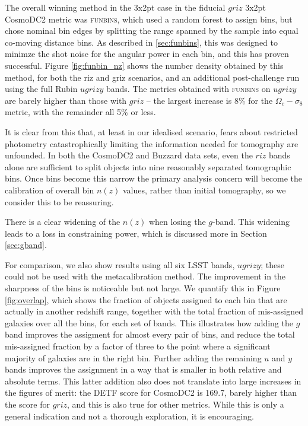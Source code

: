 \documentclass[twocolumn,twocolappendix]{aastex63}
\begin{document}
The overall winning method in the 3x2pt case in the fiducial $griz$ 3x2pt CosmoDC2 metric was \textsc{funbins},
which used a random forest to assign bins, but chose nominal bin edges by splitting the range spanned
by the sample into equal co-moving distance bins. As described in \autoref{sec:funbins},  this was designed
to minimze the shot noise for the angular power in each bin, and this has proven successful. 
Figure \ref{fig:funbin_nz} shows the number density obtained by this method, for both the riz and griz 
scenarios, and an additional post-challenge run using the full Rubin $ugrizy$ bands.  The metrics
obtained with \textsc{funbins} on $ugrizy$ are barely higher than those with $griz$ -- the largest
increase is 8\% for the $\Omega_c-\sigma_8$ metric, with the remainder all 5\% or less.

It is clear from this that, at least in our idealised scenario,  fears about restricted photometry 
catastrophically limiting
the information needed for tomography are unfounded.
In both the CosmoDC2 and Buzzard data sets,
even the $riz$ bands alone are sufficient to split objects into nine reasonably separated
tomographic bins.  Once bins become this narrow the primary analysis concern will become the calibration 
of overall bin $n(z)$ values, rather than initial tomography, so we consider this to be reassuring.

There is a clear widening of the $n(z)$ when losing the $g$-band.  This widening leads to a loss in 
constraining power, which is discussed more in Section \ref{sec:gband}.

For comparison, we also show results using all six LSST bands, $ugrizy$; these could not be used
with the metacalibration method. The improvement in the sharpness of the bins is noticeable but not large.
We quantify this in Figure \ref{fig:overlap}, which shows the fraction of objects assigned to each
bin that are actually in another redshift range, together with the total fraction of mis-assigned galaxies 
over all the bins, for each set of bands. This illustrates how adding the $g$ band improves the assigment
for almost every pair of bins, and reduce the total mis-assigned fraction by a factor of three to the 
point where a significant majority of galaxies are in the right bin.  Further adding the remaining $u$ and $y$
bands improves the assignment in a way that is smaller in both relative and absolute terms.
This latter addition also does not translate into large increases in the figures of merit: the 
DETF score for CosmoDC2 is 169.7, barely higher than the score for $griz$, and this is also true for other 
metrics.   While this is only a general indication and not a thorough exploration, it is encouraging.
\end{document}
